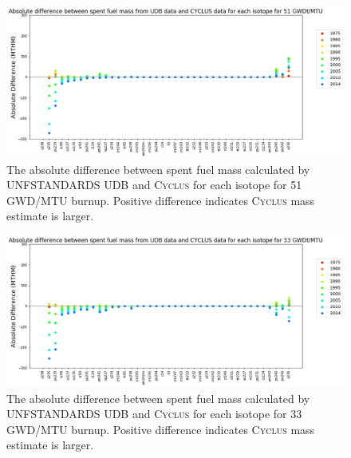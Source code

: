 \documentclass{article}
\newcommand{\Cyclus}{\textsc{Cyclus}\xspace}%
\begin{document}
\begin{figure}[htb] %
    \centering
        \includegraphics[height=0.30\textheight]{absolute_diff_all_51}
        \caption{The absolute difference between spent fuel mass calculated by 
        \gls{UNFSTANDARDS} \gls{UDB} and \Cyclus for each isotope for 51 GWD/MTU burnup. Positive difference indicates \Cyclus mass estimate is larger.}
    \label{fig:absolute_diff_all_51}
\end{figure}

\begin{figure}[htb] %
        \includegraphics[height=0.30\textheight]{absolute_diff_all_33}
        \caption{The absolute difference between spent fuel mass calculated by \gls{UNFSTANDARDS} \gls{UDB} and \Cyclus for each isotope for 33 GWD/MTU burnup. Positive difference indicates \Cyclus mass estimate is larger.}
    \label{fig:absolute_diff_all_33}
\end{figure}



\FloatBarrier


\end{document}
